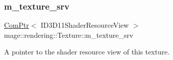 \subsubsection{\texorpdfstring{m\+\_\+texture\+\_\+srv}{m\_texture\_srv}}
{\footnotesize\ttfamily \mbox{\hyperlink{namespacemage_ae74f374780900893caa5555d1031fd79}{Com\+Ptr}}$<$ I\+D3\+D11\+Shader\+Resource\+View $>$ mage\+::rendering\+::\+Texture\+::m\+\_\+texture\+\_\+srv\hspace{0.3cm}{\ttfamily [private]}}

A pointer to the shader resource view of this texture. 